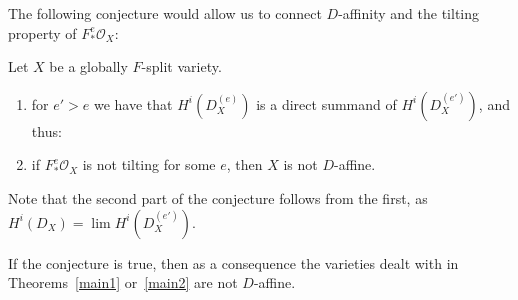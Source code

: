 \documentclass{article}
\def\O{\mathcal O}
\numberwithin{equation}{section}
\theoremstyle{theorem}
\numberwithin{thm}{section}
\theoremstyle{definition}
\begin{document}
The following conjecture would allow us to connect $D$-affinity and the tilting property of $F_*^e\O_X$:

\begin{conj}
Let $X$ be a globally $F$-split variety.
\begin{enumerate}
\item 
for $e'>e$ we have that $H^i(D^{(e)}_X)$ is a direct summand of $H^i(D^{(e')}_X)$, and thus:
\item
 if $F_*^e \O_X$ is not tilting for some $e$, then $X$ is not $D$-affine.
\end{enumerate}
\end{conj}

Note that the second part of the conjecture follows from the first, as $H^i(D_X)=\lim H^i(D^{(e')}_X)$.

If the conjecture is true, then as a consequence the varieties dealt with in Theorems~\ref{main1} or~\ref{main2} are not $D$-affine.
\end{document}
